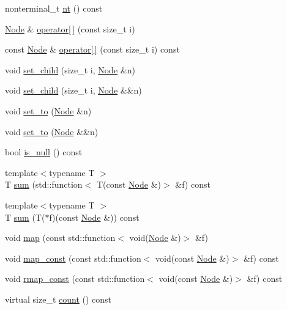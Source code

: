 \begin{DoxyCompactItemize}
\item 
nonterminal\+\_\+t \hyperlink{class_node_a4abe3acdc804489a01ef13a25b130fd8}{nt} () const
\item 
\hyperlink{class_node}{Node} \& \hyperlink{class_node_a0b89084e2c7416379edb7c537edcc8f2}{operator\mbox{[}$\,$\mbox{]}} (const size\+\_\+t i)
\item 
const \hyperlink{class_node}{Node} \& \hyperlink{class_node_a8bdfdaa5eb291ae5fb417f45fb8a3633}{operator\mbox{[}$\,$\mbox{]}} (const size\+\_\+t i) const
\item 
void \hyperlink{class_node_afff50c3712b8e30fffd479cad4eee023}{set\+\_\+child} (size\+\_\+t i, \hyperlink{class_node}{Node} \&n)
\item 
void \hyperlink{class_node_a486882370d2c9592c6eabb52a3289253}{set\+\_\+child} (size\+\_\+t i, \hyperlink{class_node}{Node} \&\&n)
\item 
void \hyperlink{class_node_a1a6f6c8062e66046c302a80cc7e8d817}{set\+\_\+to} (\hyperlink{class_node}{Node} \&n)
\item 
void \hyperlink{class_node_a10c63ea2ec819dc5b195c4df33cde113}{set\+\_\+to} (\hyperlink{class_node}{Node} \&\&n)
\item 
bool \hyperlink{class_node_a895ef3b66f975fbaec1e5866a57afbed}{is\+\_\+null} () const
\item 
{\footnotesize template$<$typename T $>$ }\\T \hyperlink{class_node_ac91282056a0df2835f1579bdd21c93e1}{sum} (std\+::function$<$ T(const \hyperlink{class_node}{Node} \&)$>$ \&f) const
\item 
{\footnotesize template$<$typename T $>$ }\\T \hyperlink{class_node_a089e99addd93f91b2ef5a9d0c3e6bdeb}{sum} (T($\ast$f)(const \hyperlink{class_node}{Node} \&)) const
\item 
void \hyperlink{class_node_adefac3cb7b411321c5af15dad1484834}{map} (const std\+::function$<$ void(\hyperlink{class_node}{Node} \&)$>$ \&f)
\item 
void \hyperlink{class_node_a4337bb93da78e142c6171fd81acab93c}{map\+\_\+const} (const std\+::function$<$ void(const \hyperlink{class_node}{Node} \&)$>$ \&f) const
\item 
void \hyperlink{class_node_a59da25cea338385d73b898b86492f97e}{rmap\+\_\+const} (const std\+::function$<$ void(const \hyperlink{class_node}{Node} \&)$>$ \&f) const
\item 
virtual size\+\_\+t \hyperlink{class_node_abd387b27e1deb45b789ad7b7abd8c6e6}{count} () const
\item 

\end{DoxyCompactItemize}
